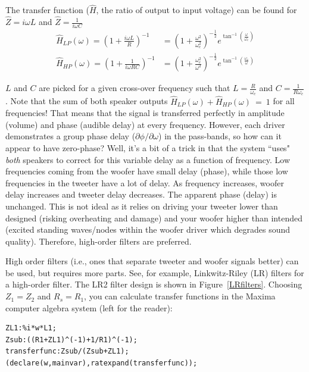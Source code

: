 \documentclass[10pt,letterpaper]{book}
\begin{document}
The transfer function ($\hat{H}$, the ratio of output to input voltage) can be found for $\hat{Z}=i\omega L$ and $\hat{Z}=\frac{1}{i\omega C}$
\begin{align}
\hat{H}_{LP}(\omega)=\left( {1+\frac{i\omega L}{R}} \right)^{-1}
&=\left( {1+\frac{\omega^2}{ \omega_c^2}}\right)^{-\frac{1}{2}} e^{\tan^{-1}\left( \frac{\omega}{\omega_c}\right)}\\
\hat{H}_{HP}(\omega)
=\left( {1+\frac{1}{i \omega R C}} \right)^{-1}
&=\left( {1+\frac{\omega_c^2}{\omega^2 }}\right)^{-\frac{1}{2}} e^{\tan^{-1}\left( \frac{\omega_c}{\omega}\right)}
\end{align}

$L$ and $C$ are picked for a given cross-over frequency such that $L=\frac{R}{\omega_c}$ and $C=\frac{1}{R\omega_c}$. Note that the sum of both speaker outputs $\hat{H}_{LP}(\omega)+\hat{H}_{HP}(\omega)~=~1$ for all frequencies! That means that the signal is transferred perfectly in amplitude (volume) and phase (audible delay) at every frequency. However, each driver demonstrates a group phase delay ($\partial \phi / \partial \omega$) in the pass-bands, so how can it appear to have zero-phase? Well, it's a bit of a trick in that the system ``uses"  \textit{both} speakers to correct for this variable delay as a function of frequency. Low frequencies coming from the woofer have small delay (phase), while those low frequencies in the tweeter have a lot of delay. As frequency increases, woofer delay increases and tweeter delay decreases. The apparent phase (delay) is unchanged. This is not ideal as it relies on driving your tweeter lower than designed (risking overheating and damage) and your woofer higher than intended (excited standing waves/nodes within the woofer driver which degrades sound quality). Therefore, high-order filters are preferred.

High order filters (i.e., ones that separate tweeter and woofer signals better) can be used, but requires more parts. See, for example, Linkwitz-Riley (LR) filters for a high-order filter. The LR2 filter design is shown in Figure~\ref{LRfilters}. Choosing $Z_1=Z_2$ and $R_s=R_1$, you can calculate transfer functions in the Maxima computer algebra system (left for the reader):
\begin{verbatim}
ZL1:%i*w*L1;
Zsub:((R1+ZL1)^(-1)+1/R1)^(-1);
transferfunc:Zsub/(Zsub+ZL1);
(declare(w,mainvar),ratexpand(transferfunc));
\end{verbatim}
\end{document}

